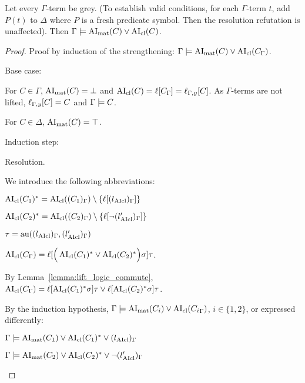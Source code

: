 \documentclass[,%
	paper=a4,%
	DIV10, %
	twoside=false,%
	liststotoc,
	bibtotoc,
	draft=false,%
	numbers=noendperiod
]{scrartcl}
\begin{document}
\begin{lemma}
	\label{ref:gamma_entails_delta_terms_lifted}
	Let every $\Gamma$-term be grey. (To establish valid conditions, for each $\Gamma$-term $t$, add $P(t)$ to $\Delta$ where $P$ is a fresh predicate symbol. Then the resolution refutation is unaffected).
	Then
	$\Gamma \models \operatorname{AI}_\mathrm{mat}(C) \lor \operatorname{AI}_\mathrm{cl}(C)$.
\end{lemma}
\begin{proof}
	Proof by induction of the strengthening:
	$\Gamma \models \operatorname{AI}_\mathrm{mat}(C) \lor \operatorname{AI}_\mathrm{cl}(C_\Gamma)$.

	Base case:

	For $C \in \Gamma$, $\operatorname{AI}_\mathrm{mat}(C) = \bot$ and $\operatorname{AI}_\mathrm{cl}(C) = \ell[C_\Gamma] = \ell_{\Gamma,y}[C]$. As $\Gamma$-terms are not lifted, $\ell_{\Gamma,y}[C] = C$ and $\Gamma \models C$.

	For $C \in \Delta$, $\operatorname{AI}_\mathrm{mat}(C) = \top$.

	Induction step:


	\begin{description}
		\item{Resolution.}
			\begin{prooftree}
			\end{prooftree}
			We introduce the following abbreviations:

			$ \operatorname{AI}_\mathrm{cl}(C_1)^* = \operatorname{AI}_\mathrm{cl}((C_1)_\Gamma) \setminus \{\ell[(l{_{\operatorname{AIcl}}})_\Gamma]\}$

			$ \operatorname{AI}_\mathrm{cl}(C_2)^* = \operatorname{AI}_\mathrm{cl}((C_2)_\Gamma)\setminus \{\ell[\lnot (l{_{\operatorname{AIcl}}'})_\Gamma]\}$

			$\tau  = \operatorname{au}((l{_{\operatorname{AIcl}}})_\Gamma, (l{_{\operatorname{AIcl}}'})_\Gamma)$

			$\operatorname{AI}_\mathrm{cl}(C_\Gamma) =
			\ell[\Big( \operatorname{AI}_\mathrm{cl}(C_1)^* \lor \operatorname{AI}_\mathrm{cl}(C_2)^* \Big)\sigma] \tau$.

			By Lemma~\ref{lemma:lift_logic_commute},
			$\operatorname{AI}_\mathrm{cl}(C_\Gamma) =
			\ell[\operatorname{AI}_\mathrm{cl}(C_1)^*\sigma]\tau \lor \ell[\operatorname{AI}_\mathrm{cl}(C_2)^*\sigma] \tau$.

			By the induction hypothesis,
			$\Gamma \models \operatorname{AI}_\mathrm{mat}(C_i) \lor \operatorname{AI}_\mathrm{cl}({C_i}_\Gamma)$, $i\in\{1,2\}$, or expressed differently:


			$\Gamma \models \operatorname{AI}_\mathrm{mat}(C_1) \lor \operatorname{AI}_\mathrm{cl}(C_1)^* \lor {(l{\ensuremath{_{\operatorname{AIcl}}}})_\Gamma}$

			$\Gamma \models \operatorname{AI}_\mathrm{mat}(C_2) \lor \operatorname{AI}_\mathrm{cl}(C_2)^* \lor {\lnot (l{\ensuremath{_{\operatorname{AIcl}}}'})_\Gamma}$


\end{description}
\end{proof}
\end{document}
